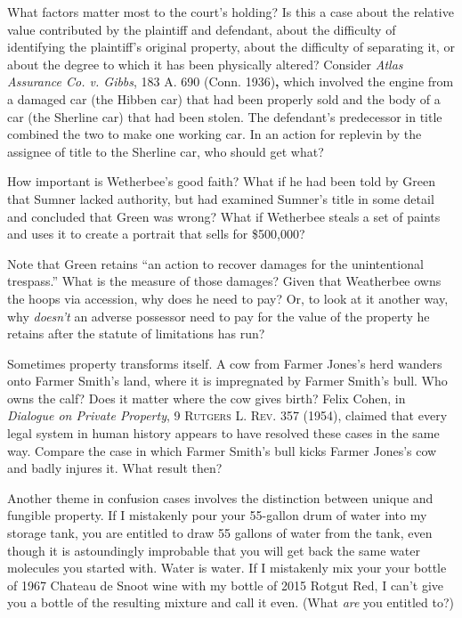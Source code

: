 
\item What factors matter most to the court's holding? Is this a case about the
relative value contributed by the plaintiff and defendant, about the difficulty
of identifying the plaintiff's original property, about the difficulty of
separating it, or about the degree to which it has been physically altered?
Consider \textit{Atlas Assurance Co. v. Gibbs}, 183 A. 690 (Conn.
1936)\textbf{, }which involved the engine from a damaged car (the Hibben car)
that had been properly sold and the body of a car (the Sherline car) that had
been stolen. The defendant's predecessor in title combined the two to make one
working car. In an action for replevin by the assignee of title to the Sherline
car, who should get what?


\item How important is Wetherbee's good faith? What if he had been told by Green
that Sumner lacked authority, but had examined Sumner's title in some detail
and concluded that Green was wrong? What if Wetherbee steals a set of paints
and uses it to create a portrait that sells for \$500,000?


\item Note that Green retains ``an action to recover damages for the
unintentional trespass.'' What is the measure of those damages? Given that
Weatherbee owns the hoops via accession, why does he need to pay? Or, to look
at it another way, why \textit{doesn't} an adverse possessor need to pay for
the value of the property he retains after the statute of limitations has run?


\item Sometimes property transforms itself. A cow from Farmer Jones's herd
wanders onto Farmer Smith's land, where it is impregnated by Farmer Smith's
bull. Who owns the calf? Does it matter where the cow gives birth? Felix Cohen,
in \textit{Dialogue on Private Property}, 9 \textsc{Rutgers
L. Rev. 357} (1954), claimed that every legal system in human history appears
to have resolved these cases in the same way. Compare the case in which Farmer
Smith's bull kicks Farmer Jones's cow and badly injures it. What result then?


\item \label{wetherbee-v-green-q-fungible}
Another theme in confusion cases involves the distinction between unique
and fungible property. If I mistakenly pour your 55-gallon drum of water into
my storage tank, you are entitled to draw 55 gallons of water from the tank,
even though it is astoundingly improbable that you will get back the same water
molecules you started with. Water is water. If I mistakenly mix your your
bottle of 1967 Chateau de Snoot wine with my bottle of 2015 Rotgut Red, I can't
give you a bottle of the resulting mixture and call it even. (What \textit{are}
you entitled to?) 

